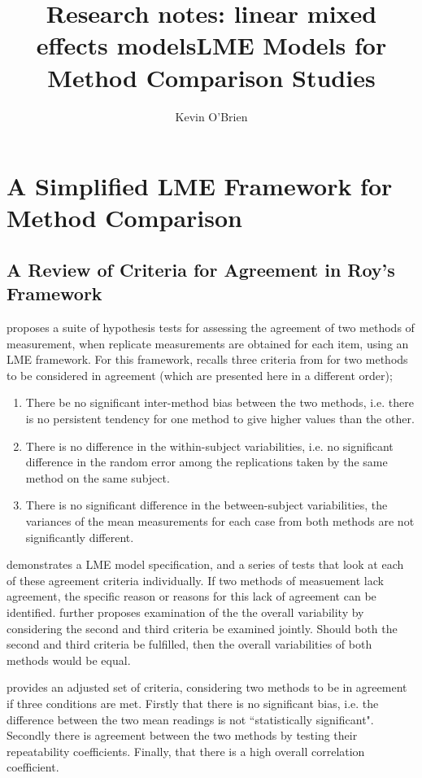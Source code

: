\documentclass[12pt, a4paper]{report}
\title{Research notes: linear mixed effects models}
\author{ } \date{ }
\theoremstyle{plain}
\theoremstyle{definition}
\theoremstyle{remark}
\begin{document}
	\author{Kevin O'Brien}
	\title{LME Models for Method Comparison Studies}
	
	\chapter{A Simplified LME Framework for Method Comparison}
	
	\section{A Review of Criteria for Agreement in Roy's Framework}
	
\citet{ARoy2009} proposes a suite of hypothesis tests for assessing the agreement of two methods of measurement, when replicate measurements are obtained for each item, using an LME framework. For this framework, \citet{ARoy2009} recalls three criteria from \citet{Barnhart} for two methods to be considered in agreement (which are presented here in a different order);

\begin{enumerate}
	\item There be no significant inter-method bias between the two methods, i.e. there is no persistent tendency for one method to give higher values than the other.
\item There is no difference in the within-subject variabilities, i.e. no significant difference in the random error among the replications taken by the same
method on the same subject. 
\item  There is no significant difference in the between-subject variabilities, the variances of the mean measurements for each case from both methods are not significantly different.
\end{enumerate} 	
\citet{ARoy2009} demonstrates a LME model specification, and a series of tests that look at each of these agreement criteria individually. If two methods of measuement lack agreement, the specific reason or reasons for this lack of agreement can be identified. \citet{ARoy2009} further proposes examination of the the overall variability by considering the second and third criteria be examined jointly. Should both the second and third criteria be fulfilled, then the overall variabilities of both methods would be equal.

\citet{ARoy2009} provides an adjusted set of criteria, considering two methods to be in agreement if three conditions are met. Firstly that there is no significant bias, i.e. the difference between the two
		mean readings is not ``statistically significant". Secondly there is
		agreement between the two methods by testing their
		repeatability coefficients. Finally, that there is a high overall correlation coefficient.
		
\end{document}
